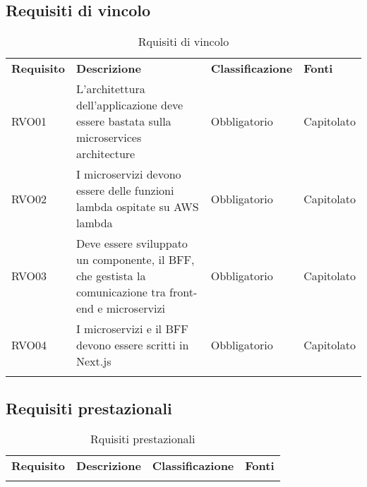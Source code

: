 \subsection{Requisiti di vincolo}
\begin{center}
    \centering
    \renewcommand{\arraystretch}{1.8}
    \label{tab:RequisitiVincolo}
    \begin{longtable}[!h]{p{50px} p{200px} p{100px} p{50px}}
        \rowcolor{logo!70} \textbf{Requisito} & \textbf{Descrizione}                                                                                     & \textbf{Classificazione} & \textbf{Fonti} \\
        RVO01                                 & L'architettura dell'applicazione deve essere bastata sulla microservices architecture                    & Obbligatorio             & Capitolato     \\
        RVO02                                 & I microservizi devono essere delle funzioni lambda ospitate su AWS lambda                                & Obbligatorio             & Capitolato     \\
        RVO03                                 & Deve essere sviluppato un componente, il BFF, che gestista la comunicazione tra front-end e microservizi & Obbligatorio             & Capitolato     \\
        RVO04                                 & I microservizi e il BFF devono essere scritti in Next.js                                                 & Obbligatorio             & Capitolato     \\
        \rowcolor{white}\caption{Rquisiti di vincolo}
    \end{longtable}
\end{center}
\subsection{Requisiti prestazionali}
\begin{center}
    \centering
    \renewcommand{\arraystretch}{1.8}
    \label{tab:RequisitiPrestazionali}
    \begin{longtable}[!h]{p{50px} p{200px} p{100px} p{50px}}
        \rowcolor{logo!70} \textbf{Requisito} & \textbf{Descrizione} & \textbf{Classificazione} & \textbf{Fonti} \\

        \rowcolor{white}\caption{Rquisiti prestazionali}
    \end{longtable}
\end{center}
